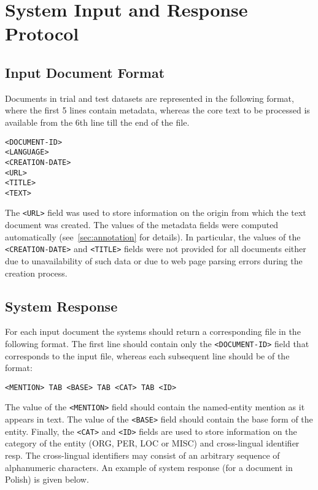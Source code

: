\documentclass[11pt]{article}
\begin{document}
\section{System Input and Response Protocol}
\label{sec:protocol}

\subsection{Input Document Format}
\label{subsec:input}

Documents in trial and test datasets are represented in the following format, where the first 5 lines 
contain metadata, whereas the core text to be processed is available from the 6th line till the 
end of the file. 

\begin{small}
\begin{verbatim}
<DOCUMENT-ID>
<LANGUAGE>
<CREATION-DATE>
<URL>
<TITLE>
<TEXT>
\end{verbatim}
\end{small}

\noindent The \verb+<URL>+ field was used to store information on the origin from which 
the text document was created. The values of the metadata fields were computed automatically 
(see~\ref{sec:annotation} for details). In particular, the values of the \verb+<CREATION-DATE>+ 
and \verb+<TITLE>+ fields were not provided for all documents either due to unavailability 
of such data or due to web page parsing errors during the creation process. 

\subsection{System Response}
\label{subsec:input}

For each input document the systems should return a corresponding file in the following format.
The first line should contain only the \verb+<DOCUMENT-ID>+ field that corresponds to the input file,
whereas each subsequent line should be of the format:

\begin{small}
\begin{verbatim}
<MENTION> TAB <BASE> TAB <CAT> TAB <ID>
\end{verbatim}
\end{small}

\noindent The value of the \verb+<MENTION>+ field should contain the named-entity mention as it 
appears in text. The value of the \verb+<BASE>+ field should contain the base form of the
entity. Finally, the \verb+<CAT>+ and \verb+<ID>+ fields are used to store information
on the category of the entity (ORG, PER, LOC or MISC) and cross-lingual identifier resp. 
The cross-lingual identifiers may consist of an arbitrary sequence of alphanumeric characters.
An example of system response (for a document in Polish) is given below.
\end{document}
